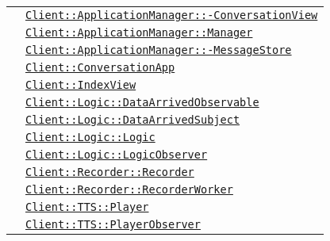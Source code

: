 \begin{longtable}{|>{\centering}m{3cm}|m{10cm}<{\centering}|}
& \hyperref[Client::ApplicationManager::ConversationView]{\texttt{Client::ApplicationManager::-\linebreak ConversationView}}\\
& \hyperref[Client::ApplicationManager::Manager]{\texttt{Client::ApplicationManager::Manager}}\\
& \hyperref[Client::ApplicationManager::MessageStore]{\texttt{Client::ApplicationManager::-\linebreak MessageStore}}\\
& \hyperref[Client::ConversationApp]{\texttt{Client::ConversationApp}}\\
& \hyperref[Client::IndexView]{\texttt{Client::IndexView}}\\
& \hyperref[Client::Logic::DataArrivedObservable]{\texttt{Client::Logic::DataArrivedObservable}}\\
& \hyperref[Client::Logic::DataArrivedSubject]{\texttt{Client::Logic::DataArrivedSubject}}\\
& \hyperref[Client::Logic::Logic]{\texttt{Client::Logic::Logic}}\\
& \hyperref[Client::Logic::LogicObserver]{\texttt{Client::Logic::LogicObserver}}\\
& \hyperref[Client::Recorder::Recorder]{\texttt{Client::Recorder::Recorder}}\\
& \hyperref[Client::Recorder::RecorderWorker]{\texttt{Client::Recorder::RecorderWorker}}\\
& \hyperref[Client::TTS::Player]{\texttt{Client::TTS::Player}}\\
& \hyperref[Client::TTS::PlayerObserver]{\texttt{Client::TTS::PlayerObserver}}\\ \hline


\end{longtable}
